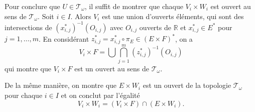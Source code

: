 Pour conclure que $U\in\mathcal{T}_\omega$, il suffit de montrer que chaque
$V_i\times W_i$ est ouvert au sens de $\mathcal{T}_\omega$. Soit $i\in I$.
Alors $V_i$ est une union d'ouverts éléments, qui sont
des intersections de $(x_{i, j}^*)^{-1}(O_{i, j})$
avec $O_{i, j}$ ouverts de $\mathbb R$ et $x_{i, j}^*\in E^*$ pour $j = 1, \ldots, m$.
En considérant $z_{i, j}^*=x^*_{i, j}\circ\pi_E\in (E\times F)^*$, on a
$$V_i\times F = \bigcup\bigcap_{j=1}^m (z_{i, j}^*)^{-1}(O_{i, j})$$
qui montre que $V_i\times F$ est un ouvert au sens de $\mathcal{T}_\omega$.

De la même manière, on montre que $E\times W_i$ est un ouvert de
la topologie $\mathcal{T}_\omega$ pour chaque $i\in I$ et on conclut
par l'égalité
$$V_i\times W_i = (V_i\times F)\cap(E\times W_i).$$
